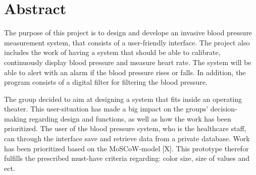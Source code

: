 {\let\clearpage\relax \chapter*{Abstract}}

The purpose of this project is to design and develope an invasive blood pressure measurement system, that consists of a user-friendly interface. The project also includes the work of having a system that should be able to calibrate, continuously display blood pressure and measure heart rate. The system will be able to alert with an alarm if the blood pressure rises or falls. In addition, the program consists of a digital filter for filtering the blood pressure.

The group decided to aim at designing a system that fits inside an operating theater. This user-situation has made a big impact on the groups' decision-making regarding design and functions, as well as how the work has been prioritized. The user of the blood pressure system, who is the healthcare staff,  can through the interface save and retrieve data from a private database. 
Work has been prioritized based on the MoSCoW-model [X]. This prototype therefor fulfills the prescribed must-have criteria regarding: color size, size of values and ect. 


\clearpage
